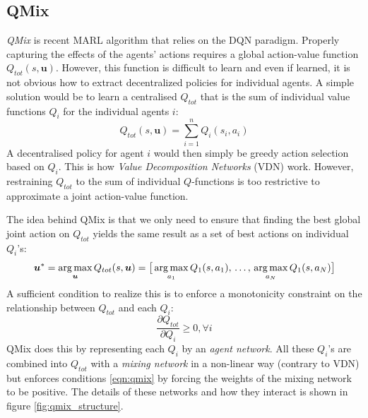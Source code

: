
\subsection{QMix}
\label{sec:intro_qmix}

\emph{QMix} \cite{rashid2018qmix} is recent MARL algorithm that relies on the DQN paradigm. Properly capturing the effects of the agents' actions requires a global action-value function $Q_{tot}(s, \bm{u})$. However,  this function is difficult to learn and even if learned, it is not obvious how to extract decentralized policies for individual agents. A simple solution would be to learn a centralised $Q_{tot}$ that is the sum of individual value functions $Q_i$ for the individual agents $i$:
\begin{equation}
    Q_{tot}(s, \bm{u}) = \sum_{i=1}^{n} Q_i(s_i, a_i)
\end{equation}
A decentralised policy for agent $i$ would then simply be greedy action selection based on $Q_i$. This is how \emph{Value Decomposition Networks} (VDN) \cite{sunehag2018value} work. However, restraining $Q_{tot}$ to the sum of individual $Q$-functions is too restrictive to approximate a joint action-value function.

The idea behind QMix is that we only need to ensure that finding the best global joint action on $Q_{tot}$ yields the same result as a set of best actions on individual $Q_i$'s:
\begin{equation}
    \bm{u}^* = \operatorname*{arg\,max}_{\bm{u}} Q_{tot}(s, \bm{u}) = \big [ \operatorname*{arg\,max}_{a_1} Q_1(s, a_1), \, \ldots,\, \operatorname*{arg\,max}_{a_N} Q_1(s, a_N) \big ]
\end{equation}
A sufficient condition to realize this is to enforce a monotonicity constraint on the relationship between $Q_{tot}$ and each $Q_i$:
\begin{equation}
    \label{eqn:qmix}
    \frac{\partial Q_{tot}}{\partial Q_i} \geq 0, \forall i
\end{equation}
QMix does this by representing each $Q_i$ by an \emph{agent network}. All these $Q_i$'s are combined into $Q_{tot}$ with a \emph{mixing network} in a non-linear way (contrary to VDN) but enforces conditions \ref{eqn:qmix} by forcing the weights of the mixing network to be positive. The details of these networks and how they interact is shown in figure \ref{fig:qmix_structure}.\\

